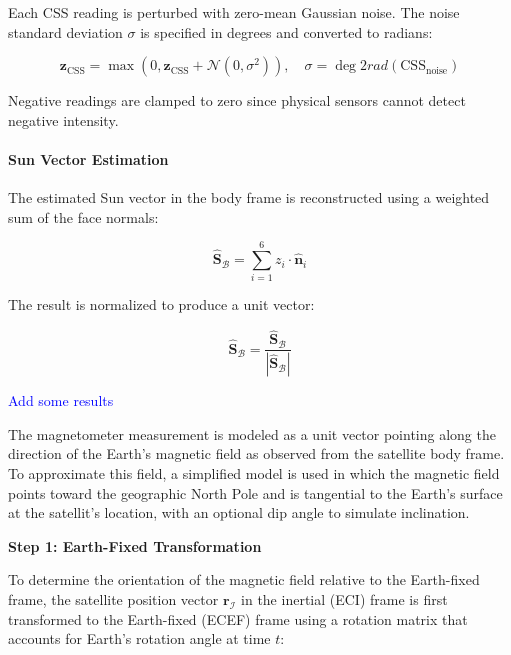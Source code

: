 Each CSS reading is perturbed with zero-mean Gaussian noise. The noise standard deviation $\sigma$ is specified in degrees and converted to radians:

\begin{equation}
    \mathbf{z}_{\text{CSS}} = \max\left( 0, \mathbf{z}_{\text{CSS}} + \mathcal{N}(0, \sigma^2) \right), \quad \sigma = \deg2rad(\text{CSS}_{\text{noise}})
\end{equation}

Negative readings are clamped to zero since physical sensors cannot detect negative intensity.

\paragraph{Sun Vector Estimation}

The estimated Sun vector in the body frame is reconstructed using a weighted sum of the face normals:

\begin{equation}
    \hat{\mathbf{S}}_\mathcal{B} = \sum_{i=1}^{6} z_i \cdot \hat{\mathbf{n}}_i
\end{equation}

The result is normalized to produce a unit vector:

\begin{equation}
    \hat{\mathbf{S}}_\mathcal{B} = \frac{\hat{\mathbf{S}}_\mathcal{B}}{|\hat{\mathbf{S}}_\mathcal{B}|}
\end{equation}


\textcolor{blue}{Add some results}


The magnetometer measurement is modeled as a unit vector pointing along the direction of the Earth's magnetic field as observed from the satellite body frame. To approximate this field, a simplified model is used in which the magnetic field points toward the geographic North Pole and is tangential to the Earth's surface at the satellit's location, with an optional dip angle to simulate inclination.

\textbf{Step 1: Earth-Fixed Transformation}

To determine the orientation of the magnetic field relative to the Earth-fixed frame, the satellite position vector $\mathbf{r}_{\mathcal{I}}$ in the inertial (ECI) frame is first transformed to the Earth-fixed (ECEF) frame using a rotation matrix that accounts for Earth's rotation angle at time $t$:

